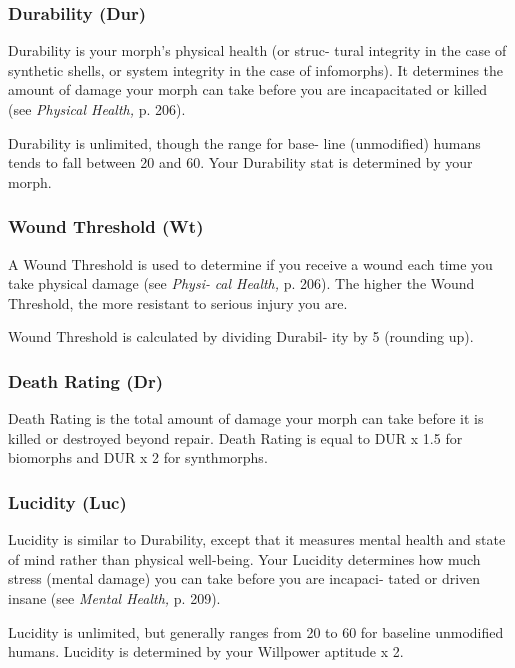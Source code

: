 \subsubsection{Durability (Dur)}

Durability is your morph's physical health (or struc-
tural integrity in the case of synthetic shells, or system 
integrity in the case of infomorphs). It determines the 
amount of damage your morph can take before you are 
incapacitated or killed (see \textit{Physical Health,} p. 206).

Durability is unlimited, though the range for base-
line (unmodified) humans tends to fall between 20 and 
60. Your Durability stat is determined by your morph.

\subsubsection{Wound Threshold (Wt)}

A Wound Threshold is used to determine if you receive a 
wound each time you take physical damage (see \textit{Physi-}
\textit{cal Health,} p. 206). The higher the Wound Threshold, 
the more resistant to serious injury you are.

Wound Threshold is calculated by dividing Durabil-
ity by 5 (rounding up).

\subsubsection{Death Rating (Dr)}

Death Rating is the total amount of damage your 
morph can take before it is killed or destroyed 
beyond repair. Death Rating is equal to DUR x 1.5 for 
biomorphs and DUR x 2 for synthmorphs.

\subsubsection{Lucidity (Luc)}

Lucidity is similar to Durability, except that it measures 
mental health and state of mind rather than physical 
well-being. Your Lucidity determines how much stress 
(mental damage) you can take before you are incapaci-
tated or driven insane (see \textit{Mental Health,} p. 209).

Lucidity is unlimited, but generally ranges from 
20 to 60 for baseline unmodified humans. Lucidity is 
determined by your Willpower aptitude x 2.

